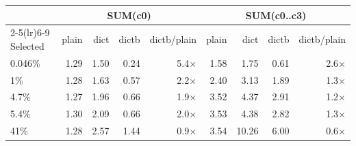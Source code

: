 \begin{tabular}{lrrrrrrrr}
\toprule
 & \multicolumn{4}{c}{SUM(c0)} & \multicolumn{4}{c}{SUM(c0..c3)} \\
\cmidrule(lr){2-5}\cmidrule(lr){6-9}
Selected & plain & dict & dictb & dictb/plain & plain & dict & dictb & dictb/plain \\
\midrule
0.046\% & 1.29 & 1.50 & 0.24 & 5.4$\times$ & 1.58 & 1.75 & 0.61 & 2.6$\times$ \\
1\% & 1.28 & 1.63 & 0.57 & 2.2$\times$ & 2.40 & 3.13 & 1.89 & 1.3$\times$ \\
4.7\% & 1.27 & 1.96 & 0.66 & 1.9$\times$ & 3.52 & 4.37 & 2.91 & 1.2$\times$ \\
5.4\% & 1.30 & 2.09 & 0.66 & 2.0$\times$ & 3.53 & 4.38 & 2.82 & 1.3$\times$ \\
41\% & 1.28 & 2.57 & 1.44 & 0.9$\times$ & 3.54 & 10.26 & 6.00 & 0.6$\times$ \\
\bottomrule
\end{tabular}
